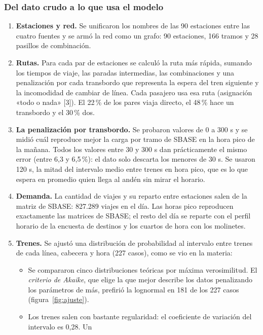 \documentclass{article}
\begin{document}
\subsubsection{Del dato crudo a lo que usa el modelo}

\begin{enumerate}
  \item \textbf{Estaciones y red.} Se unificaron los nombres de las 90 estaciones entre las cuatro fuentes y
    se armó la red como un grafo: 90 estaciones, 166 tramos y 28 pasillos de combinación.
  \item \textbf{Rutas.} Para cada par de estaciones se calculó la ruta más rápida, sumando los tiempos de
    viaje, las paradas intermedias, las combinaciones y una penalización por cada transbordo que representa
    la espera del tren siguiente y la incomodidad de cambiar de línea. Cada pasajero usa esa ruta (asignación «todo o nada» [3]). El 22\,\%
    de los pares viaja directo, el 48\,\% hace un transbordo y el 30\,\% dos.
  \item \textbf{La penalización por transbordo.} Se probaron valores de 0 a 300 s y se midió cuál reproduce
    mejor la carga por tramo de SBASE en la hora pico de la mañana. Todos los valores entre 30 y 300 s dan
    prácticamente el mismo error (entre 6,3 y 6,5\,\%): el dato solo descarta los menores de 30 s. Se usaron
    120 s, la mitad del intervalo medio entre trenes en hora pico, que es lo que espera en promedio quien
    llega al andén sin mirar el horario.
  \item \textbf{Demanda.} La cantidad de viajes y su reparto entre estaciones salen de la matriz de SBASE:
    827.289 viajes en el día. Las horas pico reproducen exactamente las matrices de SBASE; el resto del día
    se reparte con el perfil horario de la encuesta de destinos y los cuartos de hora con los molinetes.
  \item \textbf{Trenes.} Se ajustó una distribución de probabilidad al intervalo entre trenes de cada línea,
    cabecera y hora (227 casos), como se vio en la materia:
    \begin{itemize}
      \item Se compararon cinco distribuciones teóricas por máxima verosimilitud. El \emph{criterio de
        Akaike}, que elige la que mejor describe los datos penalizando los parámetros de más, prefirió la
        lognormal en 181 de los 227 casos (figura~\ref{fig:ajuste}).
      \item Los trenes salen con bastante regularidad: el coeficiente de variación del intervalo es 0,28. Un

\end{itemize}
\end{enumerate}
\end{document}
